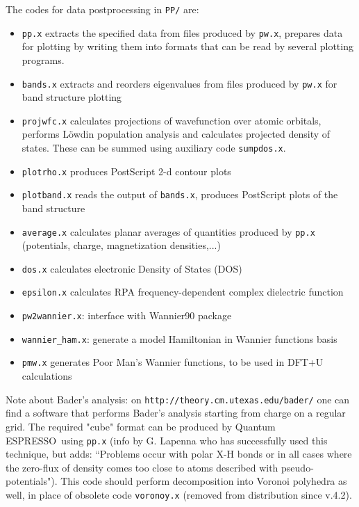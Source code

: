 \documentclass[12pt,a4paper]{article}
\def\qe{{\sc Quantum ESPRESSO}}
\def\pw.x{\texttt{pw.x}}
\begin{document}
The codes for data postprocessing in \texttt{PP/} are:
\begin{itemize}
\item  \texttt{pp.x} extracts the specified data from files produced by \pw.x,
  prepares data for plotting by writing them into formats that can be
  read by several plotting programs. 
\item  \texttt{bands.x} extracts and reorders eigenvalues from files produced by
  \pw.x for band structure plotting 
\item  \texttt{projwfc.x} calculates projections of wavefunction over atomic
  orbitals, performs L\"owdin population analysis and calculates
  projected density of states. These can be summed using auxiliary
  code  \texttt{sumpdos.x}. 
\item  \texttt{plotrho.x} produces PostScript 2-d contour plots
\item  \texttt{plotband.x} reads the output of  \texttt{bands.x}, produces 
  PostScript plots of the band structure
\item  \texttt{average.x} calculates planar averages of quantities produced by
   \texttt{pp.x} (potentials, charge, magnetization densities,...) 
\item  \texttt{dos.x} calculates electronic Density of States (DOS)
\item \texttt{epsilon.x} calculates RPA frequency-dependent complex dielectric function
\item  \texttt{pw2wannier.x}: interface with Wannier90 package
\item  \texttt{wannier\_ham.x}: generate a model Hamiltonian 
in Wannier functions basis
\item  \texttt{pmw.x} generates Poor Man's Wannier functions, to be used in
  DFT+U calculations 
\end{itemize}
Note about Bader's analysis: on
\texttt{http://theory.cm.utexas.edu/bader/} one can find a software that performs
Bader's analysis starting from charge on a regular grid. The required 
"cube" format can be produced by \qe\ using  \texttt{pp.x} (info by G. Lapenna
who has successfully used this technique, but adds: ``Problems occur with polar 
X-H bonds or in all cases where the zero-flux of density comes too close to 
atoms described with pseudo-potentials"). This code should perform 
decomposition into Voronoi polyhedra as well, in place of obsolete
code  \texttt{voronoy.x} (removed from distribution since v.4.2).
\end{document}
